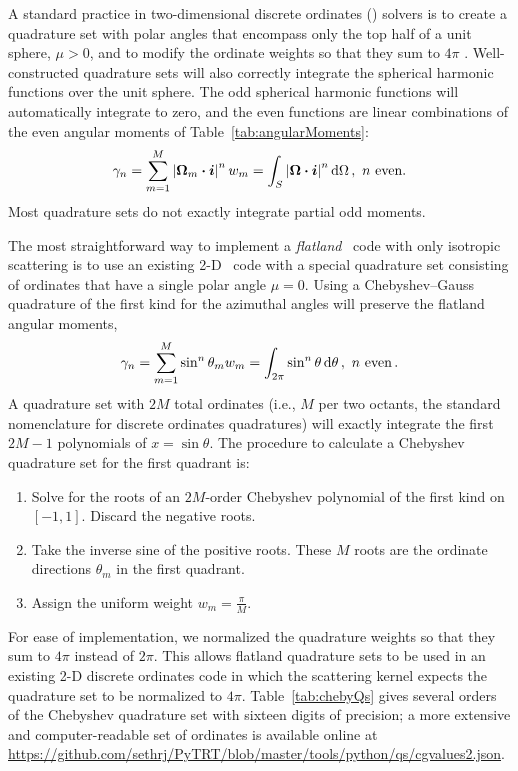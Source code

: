 A standard practice in two-dimensional discrete ordinates (\SN) solvers is to
create a quadrature set with polar angles that encompass only the top half of a
unit sphere, $\mu>0$, and to modify the ordinate weights so that they sum to
$4\pi$
\cite{Zik1997}. Well-constructed quadrature sets will also correctly
integrate the spherical harmonic functions \cite{Rab2007} over the unit sphere.
The odd spherical harmonic functions will automatically integrate to zero, and
the even
functions are linear combinations of the even angular moments of
Table~\ref{tab:angularMoments}:
\begin{equation*}
  \gamma_n
  = \sum_{m=1}^{M} \abs{ \vec{\Omega}_m \vd \vec{i}}^n w_m
  = \int_S \abs{ \vec{\Omega}\vd\vec{i} }^n \ud\Omega \,,\ n\ \text{even}.
\end{equation*}
Most quadrature sets do not exactly integrate partial odd moments.

The most straightforward way to implement a \emph{flatland} \SN\
code with only isotropic scattering is to use an existing 2-D \SN\ code with a
special quadrature set
consisting of ordinates that have a single
polar angle $\mu=0$. Using a Chebyshev--Gauss quadrature of the first kind
\cite{Str1966a} for the azimuthal angles will preserve the flatland angular moments,
\begin{equation*}
  \gamma_n
  = \sum_{m=1}^{M} \sin^n \theta_m w_m
  = \int_{2\pi} \sin^n \theta \mathop{}\!\mathrm{d}\theta\,,\ n\ \text{even} \,.
\end{equation*}
A quadrature set with $2M$ total ordinates (i.e., $M$ per two octants, the
standard nomenclature for discrete ordinates quadratures) will exactly integrate
the first $2M-1$ polynomials of $x=\sin \theta$. The procedure to calculate
a Chebyshev quadrature set for the first quadrant is:
\begin{enumerate}
  \item Solve for the roots of an $2M$-order Chebyshev polynomial of the first
    kind on $[-1,1]$. Discard the negative roots.
  \item Take the inverse sine of the positive roots. These $M$ roots are the
    ordinate directions $\theta_m$ in the first quadrant.
  \item Assign the uniform weight $w_m = \frac{\pi}{M}$.
\end{enumerate}
For ease of implementation, we normalized the quadrature weights so that they sum
to $4\pi$ instead of $2\pi$. This allows flatland quadrature sets to be used in
an existing 2-D discrete ordinates code in which the scattering kernel expects the
quadrature set to be normalized to $4\pi$. Table~\ref{tab:chebyQs} gives several
orders of the Chebyshev quadrature set with sixteen digits of precision; a more
extensive and computer-readable set of ordinates is available online at
\url{https://github.com/sethrj/PyTRT/blob/master/tools/python/qs/cgvalues2.json}.


